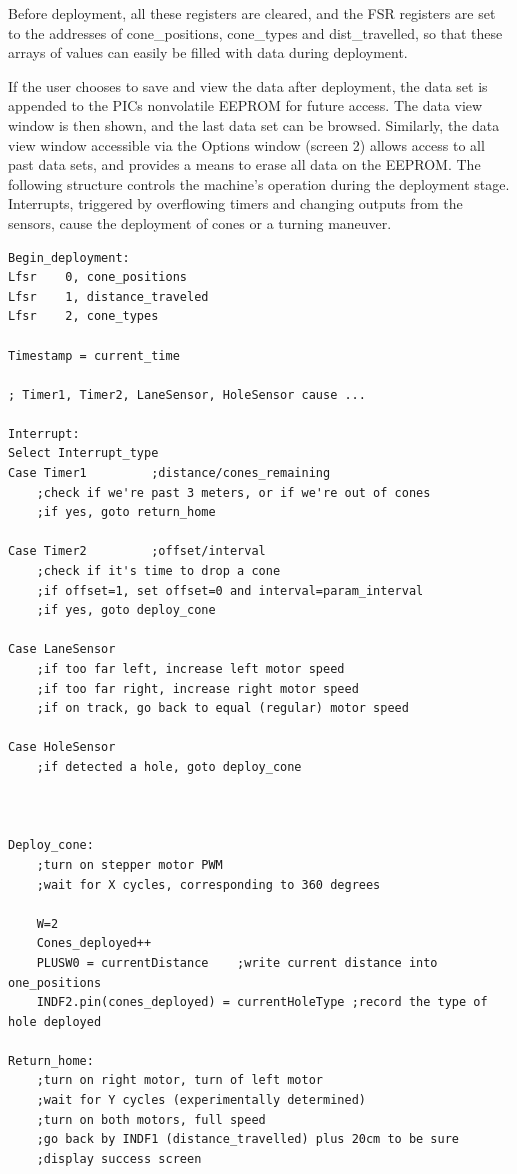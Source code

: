 \documentclass[11pt]{report}
\begin{document}
Before deployment, all these registers are cleared, and the FSR registers are set to the addresses of cone\_positions, cone\_types and dist\_travelled, so that these arrays of values can easily be filled with data during deployment.

If the user chooses to save and view the data after deployment, the data set is appended to the PICs nonvolatile EEPROM for future access. The data view window is then shown, and the last data set can be browsed. Similarly, the data view window accessible via the Options window (screen 2) allows access to all past data sets, and provides a means to erase all data on the EEPROM. The following structure controls the machine's operation during the deployment stage. Interrupts, triggered by overflowing timers and changing outputs from the sensors, cause the deployment of cones or a turning maneuver.

\begin{verbatim}
Begin_deployment:
Lfsr	0, cone_positions
Lfsr	1, distance_traveled
Lfsr	2, cone_types

Timestamp = current_time

; Timer1, Timer2, LaneSensor, HoleSensor cause ...

Interrupt:
Select Interrupt_type
Case Timer1			;distance/cones_remaining
	;check if we're past 3 meters, or if we're out of cones
	;if yes, goto return_home

Case Timer2			;offset/interval
	;check if it's time to drop a cone
	;if offset=1, set offset=0 and interval=param_interval
	;if yes, goto deploy_cone

Case LaneSensor
	;if too far left, increase left motor speed
	;if too far right, increase right motor speed
	;if on track, go back to equal (regular) motor speed
	
Case HoleSensor
	;if detected a hole, goto deploy_cone



Deploy_cone:
	;turn on stepper motor PWM
	;wait for X cycles, corresponding to 360 degrees
	
	W=2
	Cones_deployed++
	PLUSW0 = currentDistance	;write current distance into one_positions
	INDF2.pin(cones_deployed) = currentHoleType	;record the type of hole deployed

Return_home:
	;turn on right motor, turn of left motor
	;wait for Y cycles (experimentally determined)
	;turn on both motors, full speed
	;go back by INDF1 (distance_travelled) plus 20cm to be sure
	;display success screen
\end{verbatim}
\end{document}
